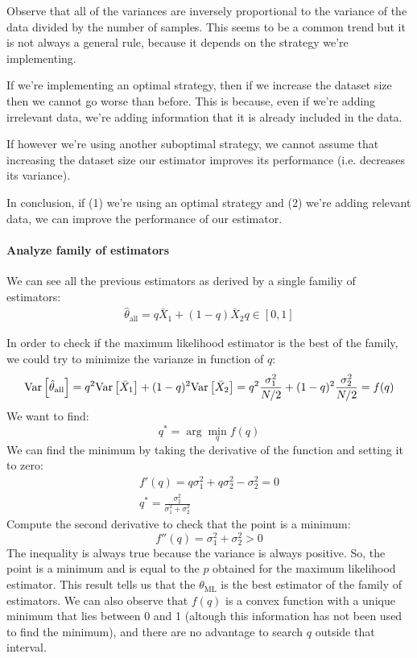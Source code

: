 \begin{remark}
    Observe that all of the variances are inversely proportional to the variance of the data divided by the number of samples. This seems to be a common trend but it is not always a general rule, because it depends on the strategy we're implementing.

    If we're implementing an optimal strategy, then if we increase the dataset size then we cannot go worse than before. This is because, even if we're adding irrelevant data, we're adding information that it is already included in the data.

    If however we're using another suboptimal strategy, we cannot assume that increasing the dataset size our estimator improves its performance (i.e. decreases its variance).

    In conclusion, if (1) we're using an optimal strategy and (2) we're adding relevant data, we can improve the performance of our estimator.
\end{remark}
\paragraph*{Analyze family of estimators}
We can see all the previous estimators as derived by a single familiy of estimators:
\begin{gather*}
    \hat{\theta}_{\text{all}} = q\bar{X}_1 + (1-q) \bar{X}_2    
    q\in[0,1]
\end{gather*}

In order to check if the maximum likelihood estimator is the best of the family, we could try to minimize the varianze in function of $q$:
\[
    \text{Var}\left[\hat{\theta}_{\text{all}}\right] = q^2\text{Var}\left[\bar{X}_1\right] + (1-q)^2\text{Var}\left[\bar{X}_2\right] = q^2\frac{\sigma_1^2}{N/2} + (1-q)^2\frac{\sigma_2^2}{N/2} = f(q)
\]
We want to find:
\[
    q^\ast = \arg\min_{q} f(q)
\]
We can find the minimum by taking the derivative of the function and setting it to zero:
\begin{gather*}
    f'(q) = q\sigma_1^2+q\sigma_2^2-\sigma_2^2 = 0 \\   
    q^\ast = \frac{\sigma_2^2}{\sigma_1^2+\sigma_2^2}
\end{gather*}
Compute the second derivative to check that the point is a minimum:
\[
    f''(q) = \sigma_1^2+\sigma_2^2 > 0
\]
The inequality is always true because the variance is always positive. So, the point is a minimum and is equal to the $p$ obtained for the maximum likelihood estimator. This result tells us that the $\theta_{\text{ML}}$ is the best estimator of the family of estimators.
We can also observe that $f(q)$ is a convex function with a unique minimum that lies between 0 and 1 (altough this information has not been used to find the minimum), and there are no advantage to search $q$ outside that interval.
